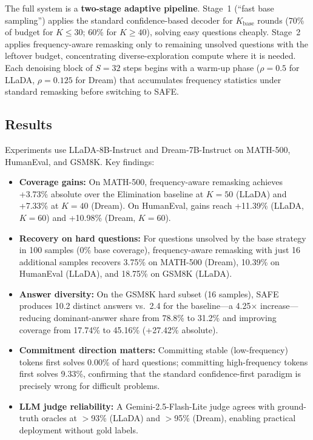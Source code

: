 \documentclass[11pt,a4paper]{article}
\begin{document}
The full system is a \textbf{two-stage adaptive pipeline}. Stage~1 (``fast base sampling'') applies the standard confidence-based decoder for $K_{\mathrm{base}}$ rounds (70\% of budget for $K \leq 30$; 60\% for $K \geq 40$), solving easy questions cheaply. Stage~2 applies frequency-aware remasking only to remaining unsolved questions with the leftover budget, concentrating diverse-exploration compute where it is needed. Each denoising block of $S{=}32$ steps begins with a warm-up phase ($\rho{=}0.5$ for LLaDA, $\rho{=}0.125$ for Dream) that accumulates frequency statistics under standard remasking before switching to SAFE.

\subsection{Results}
Experiments use LLaDA-8B-Instruct and Dream-7B-Instruct on MATH-500, HumanEval, and GSM8K. Key findings:

\begin{itemize}
  \item \textbf{Coverage gains:} On MATH-500, frequency-aware remasking achieves +3.73\% absolute over the Elimination baseline at $K{=}50$ (LLaDA) and +7.33\% at $K{=}40$ (Dream). On HumanEval, gains reach +11.39\% (LLaDA, $K{=}60$) and +10.98\% (Dream, $K{=}60$).
  \item \textbf{Recovery on hard questions:} For questions unsolved by the base strategy in 100 samples (0\% base coverage), frequency-aware remasking with just 16 additional samples recovers 3.75\% on MATH-500 (Dream), 10.39\% on HumanEval (LLaDA), and 18.75\% on GSM8K (LLaDA).
  \item \textbf{Answer diversity:} On the GSM8K hard subset (16 samples), SAFE produces 10.2 distinct answers vs.\ 2.4 for the baseline---a 4.25$\times$ increase---reducing dominant-answer share from 78.8\% to 31.2\% and improving coverage from 17.74\% to 45.16\% (+27.42\% absolute).
  \item \textbf{Commitment direction matters:} Committing stable (low-frequency) tokens first solves 0.00\% of hard questions; committing high-frequency tokens first solves 9.33\%, confirming that the standard confidence-first paradigm is precisely wrong for difficult problems.
  \item \textbf{LLM judge reliability:} A Gemini-2.5-Flash-Lite judge agrees with ground-truth oracles at $>$93\% (LLaDA) and $>$95\% (Dream), enabling practical deployment without gold labels.
\end{itemize}
\end{document}
